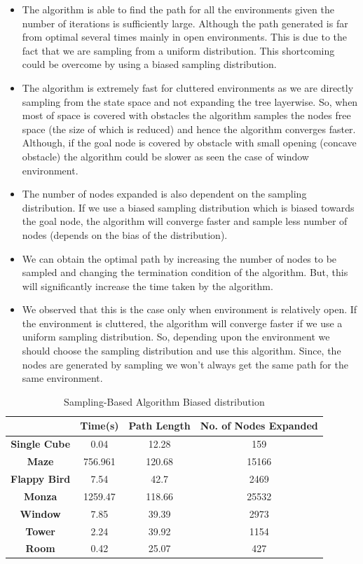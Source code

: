 \documentclass[conference]{IEEEtran}
\begin{document}
\begin{itemize}
    \item The algorithm is able to find the path for all the environments given the number of iterations is sufficiently large. Although the path generated is far from optimal several times mainly in open environments. This is due to the fact that we are sampling from a uniform distribution. 
    This shortcoming could be overcome by using a biased sampling distribution.
    \item The algorithm is extremely fast for cluttered environments as we are directly sampling from the state space and not expanding the tree layerwise. So, when most of space is covered with obstacles
    the algorithm samples the nodes free space (the size of which is reduced) and hence the algorithm converges faster. Although, if the goal node is covered by obstacle with small opening (concave obstacle) the algorithm could be slower as seen the case of window environment.
    \item The number of nodes expanded is also dependent on the sampling distribution. If we use a biased sampling distribution which is biased towards the goal node, the algorithm will converge faster and sample less number of nodes (depends on the bias of the distribution).
    \item We can obtain the optimal path by increasing the number of nodes to be sampled and changing the termination condition of the algorithm. But, this will significantly increase the time taken by the algorithm.
    \item We observed that this is the case only when environment is relatively open. If the environment is cluttered, the algorithm will converge faster if we use a uniform sampling distribution.
    So, depending upon the environment we should choose the sampling distribution and use this algorithm. Since, the nodes are generated by sampling we won't always get the same path for the same environment.
\end{itemize}
\begin{table}
    \centering
    \caption{Sampling-Based Algorithm Biased distribution}
    \label{tab:tab6}
    \begin{tabular}{|c|c|c|c|}
    \hline
    & \textbf{Time(s)} & \textbf{Path Length} & \textbf{No. of Nodes Expanded} \\ \hline
    \textbf{Single Cube} & 0.04 & 12.28 & 159 \\ \hline
    \textbf{Maze} & 756.961 & 120.68 & 15166 \\ \hline 
    \textbf{Flappy Bird} & 7.54 & 42.7 & 2469 \\ \hline
    \textbf{Monza} & 1259.47 & 118.66 & 25532 \\ \hline %
    \textbf{Window} & 7.85 & 39.39 & 2973 \\ \hline
    \textbf{Tower} & 2.24 & 39.92 & 1154 \\ \hline
    \textbf{Room} & 0.42 & 25.07 & 427 \\ \hline
    \end{tabular}
    \end{table}
\end{document}
